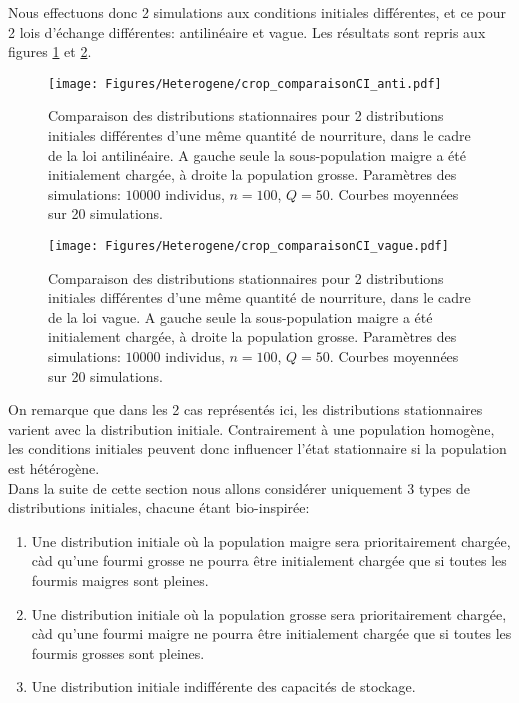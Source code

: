 Nous effectuons donc 2 simulations aux conditions initiales différentes, et ce pour 2 lois d'échange différentes: antilinéaire et vague. Les résultats sont repris aux figures \ref{comparaison_CI_anti} et \ref{comparaison_CI_vague}.\\

\begin{figure}[h!]
\centering
\texttt{[image: Figures/Heterogene/crop\_comparaisonCI\_anti.pdf]}
\caption{Comparaison des distributions stationnaires pour 2 distributions initiales différentes d'une même quantité de nourriture, dans le cadre de la loi antilinéaire. A gauche seule la sous-population maigre a été initialement chargée, à droite la population grosse. Paramètres des simulations: $10000$ individus, $n=100$, $Q = 50$. Courbes moyennées sur 20 simulations.}
\label{comparaison_CI_anti}
\end{figure}

\begin{figure}[h!]
\centering
\texttt{[image: Figures/Heterogene/crop\_comparaisonCI\_vague.pdf]}
\caption{Comparaison des distributions stationnaires pour 2 distributions initiales différentes d'une même quantité de nourriture, dans le cadre de la loi vague. A gauche seule la sous-population maigre a été initialement chargée, à droite la population grosse. Paramètres des simulations: $10000$ individus, $n=100$, $Q = 50$. Courbes moyennées sur 20 simulations.}
\label{comparaison_CI_vague}
\end{figure}

On remarque que dans les 2 cas représentés ici, les distributions stationnaires varient avec la distribution initiale. Contrairement à une population homogène, les conditions initiales peuvent donc influencer l'état stationnaire si la population est hétérogène.\\

Dans la suite de cette section nous allons considérer uniquement 3 types de distributions initiales, chacune étant bio-inspirée:
\begin{enumerate}
\item Une distribution initiale où la population maigre sera prioritairement chargée, càd qu'une fourmi grosse ne pourra être initialement chargée que si toutes les fourmis maigres sont pleines.
\item Une distribution initiale où la population grosse sera prioritairement chargée, càd qu'une fourmi maigre ne pourra être initialement chargée que si toutes les fourmis grosses sont pleines.
\item Une distribution initiale indifférente des capacités de stockage.
\end{enumerate}


